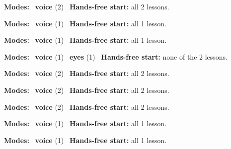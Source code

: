 \expandafter\def\csname hlchaptermodality5\endcsname{%
  {\small\noindent
    \textbf{Modes:} \hlvoicesign{}~\textbf{voice} (2)\quad
    \hlvoicesign{}~\textbf{Hands-free start:} all 2 lessons.%
    \par}\medskip
}

\expandafter\def\csname hlchaptermodality6\endcsname{%
  {\small\noindent
    \textbf{Modes:} \hlvoicesign{}~\textbf{voice} (1)\quad
    \hlvoicesign{}~\textbf{Hands-free start:} all 1 lesson.%
    \par}\medskip
}

\expandafter\def\csname hlchaptermodality7\endcsname{%
  {\small\noindent
    \textbf{Modes:} \hlvoicesign{}~\textbf{voice} (1)\quad
    \hlvoicesign{}~\textbf{Hands-free start:} all 1 lesson.%
    \par}\medskip
}

\expandafter\def\csname hlchaptermodality8\endcsname{%
  {\small\noindent
    \textbf{Modes:} \hlvoicesign{}~\textbf{voice} (1) \quad \hlsightsign{}~\textbf{eyes} (1)\quad
    \hlvoicesign{}~\textbf{Hands-free start:} none of the 2 lessons.%
    \par}\medskip
}

\expandafter\def\csname hlchaptermodality9\endcsname{%
  {\small\noindent
    \textbf{Modes:} \hlvoicesign{}~\textbf{voice} (2)\quad
    \hlvoicesign{}~\textbf{Hands-free start:} all 2 lessons.%
    \par}\medskip
}

\expandafter\def\csname hlchaptermodality10\endcsname{%
  {\small\noindent
    \textbf{Modes:} \hlvoicesign{}~\textbf{voice} (2)\quad
    \hlvoicesign{}~\textbf{Hands-free start:} all 2 lessons.%
    \par}\medskip
}

\expandafter\def\csname hlchaptermodality11\endcsname{%
  {\small\noindent
    \textbf{Modes:} \hlvoicesign{}~\textbf{voice} (2)\quad
    \hlvoicesign{}~\textbf{Hands-free start:} all 2 lessons.%
    \par}\medskip
}

\expandafter\def\csname hlchaptermodality12\endcsname{%
  {\small\noindent
    \textbf{Modes:} \hlvoicesign{}~\textbf{voice} (1)\quad
    \hlvoicesign{}~\textbf{Hands-free start:} all 1 lesson.%
    \par}\medskip
}

\expandafter\def\csname hlchaptermodality13\endcsname{%
  {\small\noindent
    \textbf{Modes:} \hlvoicesign{}~\textbf{voice} (1)\quad
    \hlvoicesign{}~\textbf{Hands-free start:} all 1 lesson.%
    \par}\medskip
}

